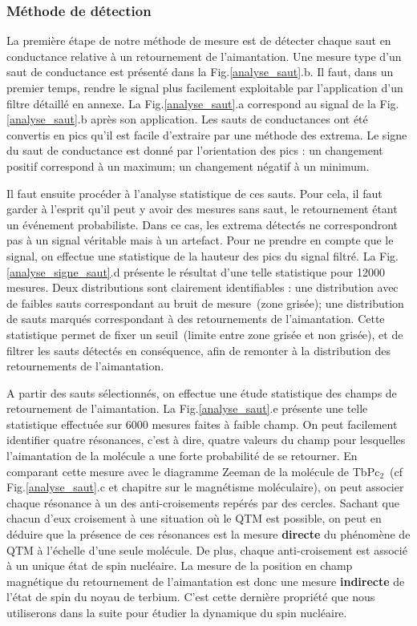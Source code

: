\subsubsection{Méthode de détection}
La première étape de notre méthode de mesure est de détecter chaque saut en conductance relative à un retournement de l'aimantation. Une mesure type d'un saut de conductance est présenté dans la Fig.\ref{analyse_saut}.b. Il faut, dans un premier temps, rendre le signal plus facilement exploitable par l'application d'un filtre détaillé en annexe. La Fig.\ref{analyse_saut}.a correspond au signal de la Fig.\ref{analyse_saut}.b après son application. Les sauts de conductances ont été convertis en pics qu'il est facile d'extraire par une méthode des extrema. Le signe du saut de conductance est donné par l'orientation des pics : un changement positif correspond à un maximum; un changement négatif à un minimum.

Il faut ensuite procéder à l'analyse statistique de ces sauts. Pour cela, il faut garder à l'esprit qu'il peut y avoir des mesures sans saut, le retournement étant un événement probabiliste. Dans ce cas, les extrema détectés ne correspondront pas à un signal véritable mais à un artefact. Pour ne prendre en compte que le signal, on effectue une statistique de la hauteur des pics du signal filtré. La Fig.\ref{analyse_signe_saut}.d présente le résultat d'une telle statistique pour 12000 mesures. Deux distributions sont clairement identifiables : une distribution avec de faibles sauts correspondant au bruit de mesure~(zone grisée); une distribution de sauts marqués correspondant à des retournements de l'aimantation. Cette statistique permet de fixer un seuil~(limite entre zone grisée et non grisée), et de filtrer les sauts détectés en conséquence, afin de remonter à la distribution des retournements de l'aimantation.

A partir des sauts sélectionnés, on effectue une étude statistique des champs de retournement de l'aimantation. La Fig.\ref{analyse_saut}.e présente une telle statistique effectuée sur 6000 mesures faites à faible champ. On peut facilement identifier quatre résonances, c'est à dire, quatre valeurs du champ pour lesquelles l'aimantation de la molécule a une forte probabilité de se retourner. En comparant cette mesure avec le diagramme Zeeman de la molécule de TbPc$_2$~(cf Fig.\ref{analyse_saut}.c et chapitre sur le magnétisme moléculaire), on peut associer chaque résonance à un des anti-croisements repérés par des cercles. Sachant que chacun d'eux croisement à une situation où le QTM est possible, on peut en déduire que la présence de ces résonances est la mesure \textbf{directe} du phénomène de QTM à l'échelle d'une seule molécule. De plus, chaque anti-croisement est associé à un unique état de spin nucléaire. La mesure de la position en champ magnétique du retournement de l'aimantation est donc une mesure \textbf{indirecte} de l'état de spin du noyau de terbium. C'est cette dernière propriété que nous utiliserons dans la suite pour étudier la dynamique du spin nucléaire.

